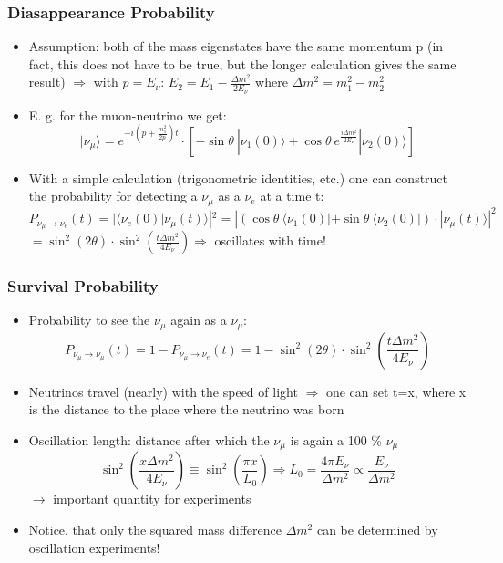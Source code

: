 \documentclass{beamer}
\begin{document}
\begin{frame}
  \frametitle{Diasappearance Probability}

  \begin{itemize}
    \item Assumption: both of the mass eigenstates have the same momentum p (in fact, this does not have to be true, but the longer calculation gives the same result) $\Rightarrow$ with $p=E_{\nu}$: $E_2=E_1-\frac{\Delta m^2}{2E_{\nu}}$ where $\Delta m^2 =m_1^2 - m_2^2$

	\item E. g. for the muon-neutrino we get: $$|\nu_{\mu} \rangle =e^{-i(p+\frac{m_{1}^2}{2p})t} \cdot \left[ -\sin\theta \ |\nu_1(0) \rangle +\cos\theta \ e^{\frac{i\Delta m^2}{2E_{\nu}}} |\nu_2(0) \rangle \right]$$
    
	\item With a simple calculation (trigonometric identities, etc.) one can construct the probability for detecting a $\nu_{\mu}$ as a $\nu_e$ at a time t: $$P_{\nu_{\mu}\rightarrow \nu_{e}}(t)=| \langle \nu_{e}(0)|\nu_{\mu}(t) \rangle |^2=|(\cos\theta \ \langle \nu_1(0)| + \sin \theta \ \langle \nu_2(0)| ) \cdot |\nu_{\mu}(t) \rangle |^2$$ $=\sin^2 (2\theta) \cdot \sin^2 (\frac{t \Delta m^2}{4E_{\nu}} ) \Rightarrow$ oscillates with time!  
   

   \end{itemize}
\end{frame}



\begin{frame}
  \frametitle{Survival Probability}

  \begin{itemize}
    \item Probability to see the $\nu_{\mu}$ again as a $\nu_{\mu}$: $$P_{\nu_{\mu}\rightarrow \nu_{\mu}}(t)=1-P_{\nu_{\mu}\rightarrow \nu_{e}}(t)=1-\sin^2 (2\theta) \cdot \sin^2 (\frac{t \Delta m^2}{4E_{\nu}} )$$ 

	\item Neutrinos travel (nearly) with the speed of light $\Rightarrow$ one can set t=x, where x is the distance to the place where the neutrino was born

	\item Oscillation length: distance after which the $\nu_{\mu}$ is again a 100 \% $\nu_{\mu}$ $$ \sin^2(\frac{x \Delta m^2}{4E_{\nu}})\equiv \sin^2(\frac{\pi x}{L_0}) \Rightarrow L_0=\frac{4\pi E_{\nu}}{\Delta m^2} \propto \frac{E_{\nu}}{\Delta m^2}$$ 
   $\rightarrow$ important quantity for experiments

	\item Notice, that only the squared mass difference $\Delta m^2$ can be determined by oscillation experiments!

   \end{itemize}
\end{frame}
\end{document}
